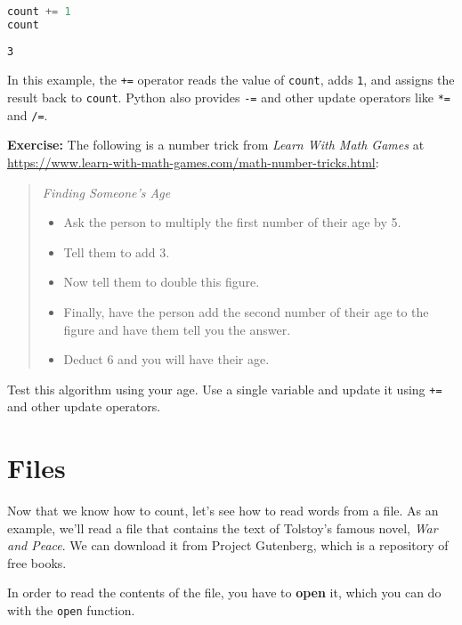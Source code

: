 \begin{lstlisting}[language=Python,style=source]
count += 1
count
\end{lstlisting}

\begin{lstlisting}[style=output]
3
\end{lstlisting}

In this example, the \passthrough{\lstinline!+=!} operator reads the
value of \passthrough{\lstinline!count!}, adds
\passthrough{\lstinline!1!}, and assigns the result back to
\passthrough{\lstinline!count!}. Python also provides
\passthrough{\lstinline!-=!} and other update operators like
\passthrough{\lstinline!*=!} and \passthrough{\lstinline!/=!}.

\textbf{Exercise:} The following is a number trick from \emph{Learn With
Math Games} at
\url{https://www.learn-with-math-games.com/math-number-tricks.html}:

\begin{quote}
\emph{Finding Someone's Age}

\begin{itemize}
\item
  Ask the person to multiply the first number of their age by 5.
\item
  Tell them to add 3.
\item
  Now tell them to double this figure.
\item
  Finally, have the person add the second number of their age to the
  figure and have them tell you the answer.
\item
  Deduct 6 and you will have their age.
\end{itemize}
\end{quote}

Test this algorithm using your age. Use a single variable and update it
using \passthrough{\lstinline!+=!} and other update operators.

\hypertarget{files}{%
\section{Files}\label{files}}

Now that we know how to count, let's see how to read words from a file.
As an example, we'll read a file that contains the text of Tolstoy's
famous novel, \emph{War and Peace}. We can download it from Project
Gutenberg, which is a repository of free books.

In order to read the contents of the file, you have to \textbf{open} it,
which you can do with the \passthrough{\lstinline!open!} function.

